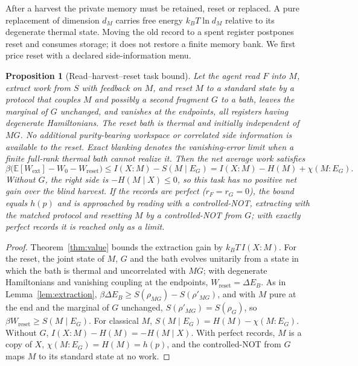 \documentclass[12pt]{article}
\newtheorem{proposition}[theorem]{Proposition}
\begin{document}
After a harvest the private memory must be retained, reset or replaced. A pure replacement of dimension $d_M$ carries free energy $k_BT\ln d_M$ relative to its degenerate thermal state. Moving the old record to a spent register postpones reset and consumes storage; it does not restore a finite memory bank. We first price reset with a declared side-information menu.

\begin{proposition}[Read--harvest--reset task bound]
\label{prop:cycle}
Let the agent read $F$ into $M$, extract work from $S$ with feedback on $M$, and reset $M$ to a standard state by a protocol that couples $M$ and possibly a second fragment $G$ to a bath, leaves the marginal of $G$ unchanged, and vanishes at the endpoints, all registers having degenerate Hamiltonians. The reset bath is thermal and initially independent of $MG$. No additional purity-bearing workspace or correlated side information is available to the reset. Exact blanking denotes the vanishing-error limit when a finite full-rank thermal bath cannot realize it. Then the net average work satisfies
\[
\beta\bigl(\mathbb E[W_{\mathrm{ext}}]-W_0-W_{\mathrm{reset}}\bigr)\le I(X{:}M)-S(M\mid E_G)=I(X{:}M)-H(M)+\chi(M{:}E_G).
\]
Without $G$, the right side is $-H(M\mid X)\le0$, so this task has no positive net gain over the blind harvest. If the records are perfect ($r_F=r_G=0$), the bound equals $h(p)$ and is approached by reading with a controlled-NOT, extracting with the matched protocol and resetting $M$ by a controlled-NOT from $G$; with exactly perfect records it is reached only as a limit.
\end{proposition}

\begin{proof}
Theorem~\ref{thm:value} bounds the extraction gain by $k_BT\,I(X{:}M)$. For the reset, the joint state of $M$, $G$ and the bath evolves unitarily from a state in which the bath is thermal and uncorrelated with $MG$; with degenerate Hamiltonians and vanishing coupling at the endpoints, $W_{\mathrm{reset}}=\Delta E_B$. As in Lemma~\ref{lem:extraction}, $\beta\Delta E_B\ge S(\rho_{MG})-S(\rho'_{MG})$, and with $M$ pure at the end and the marginal of $G$ unchanged, $S(\rho'_{MG})=S(\rho_G)$, so $\beta W_{\mathrm{reset}}\ge S(M\mid E_G)$. For classical $M$, $S(M\mid E_G)=H(M)-\chi(M{:}E_G)$. Without $G$, $I(X{:}M)-H(M)=-H(M\mid X)$. With perfect records, $M$ is a copy of $X$, $\chi(M{:}E_G)=H(M)=h(p)$, and the controlled-NOT from $G$ maps $M$ to its standard state at no work.
\end{proof}
\end{document}
